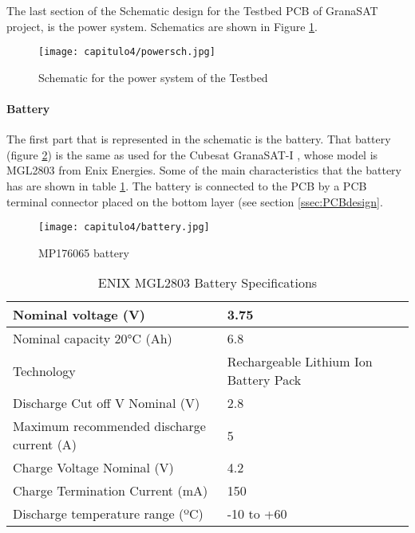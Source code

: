 The last section of the Schematic design for the Testbed \acrshort{PCB} of \gls{GranaSAT} project, is the power system. Schematics are shown in Figure \ref{fig:powersch}.
\begin{landscape}
\begin{figure}[H]
	\centering
		\texttt{[image: capitulo4/powersch.jpg]}
	\caption{Schematic for the power system of the Testbed}
	\label{fig:powersch}
\end{figure}
\end{landscape}

\paragraph{Battery} \label{battery}
The first part that is represented in the schematic is the battery. That battery (figure \ref{fig:battery}) is the same as used for the Cubesat \gls{GranaSAT}-I \cite{battery}, whose model is MGL2803 from Enix Energies. Some of the main characteristics that the battery has are shown in table \ref{tab:battery}. The battery is connected to the \acrshort{PCB} by a \acrshort{PCB} terminal connector placed on the bottom layer (see section \ref{ssec:PCBdesign}.

\begin{figure}[H]
	\centering
		\texttt{[image: capitulo4/battery.jpg]}
	\caption{ MP176065 battery}
	\label{fig:battery}
\end{figure}

\begin{table}[H]
\centering
\begin{tabular}{|l|l|}
\hline
Nominal voltage (V) & 3.75 \\ \hline
Nominal capacity 20°C (Ah)     & 6.8     \\ \hline
Technology            & Rechargeable Lithium Ion Battery Pack       \\ \hline
Discharge Cut off V Nominal (V)          & 2.8    \\ \hline
Maximum recommended discharge current (A)      &  5                       \\ \hline
Charge Voltage Nominal  (V)          & 4.2     \\ \hline
Charge Termination Current  (mA)          & 150    \\ \hline
Discharge temperature range (ºC)          & -10 to +60     \\ \hline
\end{tabular}
\caption{ENIX MGL2803 Battery Specifications \cite{S1M} }\label{tab:battery}
\end{table}

